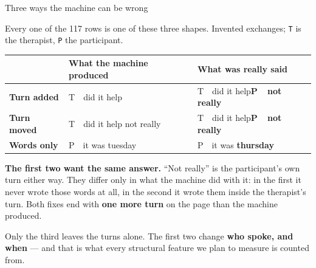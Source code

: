 \documentclass[aspectratio=169]{beamer}
\newcommand{\keybox}[1]{%
  \par\vspace{4pt}\begingroup\centering
  \colorbox{warmbg}{\parbox{0.93\textwidth}{\centering #1}}%
  \par\endgroup\vspace{2pt}}
\newenvironment{nicetable}[1]
  {\par\vspace{2pt}\begingroup\centering\small
   \renewcommand{\arraystretch}{1.18}%
   \setlength{\tabcolsep}{6pt}\rowcolors{2}{band}{white}%
   \begin{tabular}{#1}\arrayrulecolor{hdr}\toprule}
  {\bottomrule\end{tabular}\par\endgroup\vspace{2pt}}
\newcommand{\hd}[1]{\textcolor{hdr}{\textbf{#1}}}
\newcommand{\num}[1]{\textcolor{warm}{\textbf{#1}}}
\begin{document}
\begin{frame}{Three ways the machine can be wrong}

Every one of the 117 rows is one of these three shapes. Invented exchanges;
\texttt{T} is the therapist, \texttt{P} the participant.

\begin{nicetable}{p{1.9cm}p{4.9cm}p{4.0cm}}
\hd{} & \hd{What the machine produced} & \hd{What was really said} \\ \midrule
\hd{Turn added}
  & \ttfamily T~~did it help
  & \ttfamily T~~did it help\newline \textbf{P~~not really} \\
\hd{Turn moved}
  & \ttfamily T~~did it help not really
  & \ttfamily T~~did it help\newline \textbf{P~~not really} \\
\hd{Words only}
  & \ttfamily P~~it was tuesday
  & \ttfamily P~~it was \textbf{thursday} \\
\end{nicetable}

\vspace{0.1em}
{\small \textbf{The first two want the same answer.} ``Not really'' is the participant's
own turn either way. They differ only in what the machine did with it: in the first it never
wrote those words at all, in the second it wrote them inside the therapist's turn. Both
fixes end with \num{one more turn} on the page than the machine produced.}

\keybox{Only the third leaves the turns alone. The first two change \textbf{who spoke, and
when} --- and that is what every structural feature we plan to measure is counted from.}

\end{frame}
\end{document}
